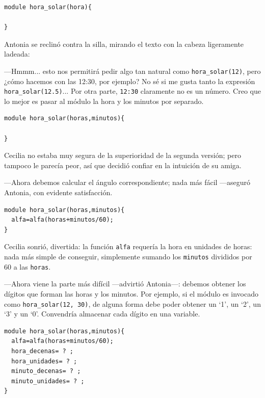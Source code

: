 \begin{lstlisting}
module hora_solar(hora){

}
\end{lstlisting}



Antonia se reclinó contra la silla, mirando el texto con la cabeza
ligeramente ladeada:

---Hmmm... esto nos permitirá pedir algo tan natural como
\lstinline!hora_solar(12)!, pero ¿cómo hacemos con las 12:30, por
ejemplo? No sé si me gusta tanto la expresión
\lstinline!hora_solar(12.5)!... Por otra parte, \lstinline!12:30!
claramente no es un número. Creo que lo mejor es pasar al módulo la
hora y los minutos por separado.

\begin{lstlisting}
module hora_solar(horas,minutos){

}
\end{lstlisting}


Cecilia no estaba muy segura de la superioridad de la segunda versión;
pero tampoco le parecía peor, así que decidió confiar en la intuición
de su amiga.

---Ahora debemos calcular el ángulo correspondiente; nada más fácil
---aseguró Antonia, con evidente satisfacción.

\begin{lstlisting}
module hora_solar(horas,minutos){
  alfa=alfa(horas+minutos/60);
}
\end{lstlisting}



Cecilia sonrió, divertida: la función \lstinline!alfa! requería la
hora en unidades de horas: nada más simple de conseguir, simplemente
sumando los \lstinline!minutos! divididos por 60 a las
\lstinline!horas!.

---Ahora viene la parte más difícil ---advirtió Antonia---: debemos
obtener los dígitos que forman las horas y los minutos. Por ejemplo,
si el módulo es invocado como \lstinline!hora_solar(12, 30)!, de
alguna forma debe poder obtener un `1', un `2', un `3' y un
`0'. Convendría almacenar cada dígito en una variable.
 

\begin{lstlisting}
module hora_solar(horas,minutos){
  alfa=alfa(horas+minutos/60);
  hora_decenas= ? ;
  hora_unidades= ? ;
  minuto_decenas= ? ;
  minuto_unidades= ? ;
}
\end{lstlisting}

